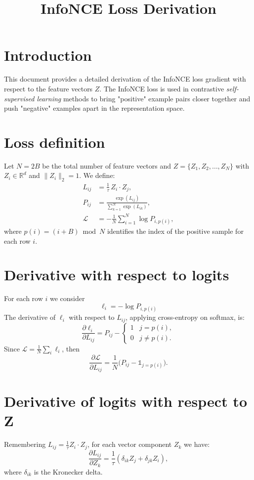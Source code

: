 \documentclass[a4paper,11pt]{article}
\title{InfoNCE Loss Derivation}
\author{}
\date{}
\begin{document}
\maketitle

\section*{Introduction}
This document provides a detailed derivation of the InfoNCE loss gradient with respect to the feature vectors $Z$. The InfoNCE loss is used in contrastive \emph{self-supervised learning} methods to bring "positive" example pairs closer together and push "negative" examples apart in the representation space.

\section{Loss definition}
Let $N=2B$ be the total number of feature vectors and $Z=\{Z_1, Z_2, \dots, Z_N\}$ with $Z_i\in\mathbb{R}^d$ and $\|Z_i\|_2=1$. We define:
\begin{align*}
L_{ij} &= \frac{1}{\tau} \, Z_i \cdot Z_j, \\
P_{ij} &= \frac{\exp(L_{ij})}{\sum_{k=1}^{N} \exp(L_{ik})}, \\
\mathcal{L} &= -\frac{1}{N} \sum_{i=1}^{N} \log P_{i, p(i)},
\end{align*}
where $p(i)=(i+B)\bmod N$ identifies the index of the positive sample for each row $i$.

\section{Derivative with respect to logits}
For each row $i$ we consider
\[
\ell_i = -\log P_{i,p(i)}
\]
The derivative of $\ell_i$ with respect to $L_{ij}$, applying cross-entropy on softmax, is:
\[
\frac{\partial \ell_i}{\partial L_{ij}} = P_{ij} - \begin{cases}1 & j = p(i), \\ 0 & j \neq p(i).\end{cases}
\]
Since $\mathcal{L}=\frac{1}{N}\sum_i \ell_i$, then
\[
\frac{\partial \mathcal{L}}{\partial L_{ij}} = \frac{1}{N}\bigl(P_{ij} - \mathbb{1}_{j=p(i)}\bigr).
\]

\section{Derivative of logits with respect to Z}
Remembering $L_{ij}=\tfrac{1}{\tau} Z_i \cdot Z_j$, for each vector component $Z_k$ we have:
\[
\frac{\partial L_{ij}}{\partial Z_k} = \frac{1}{\tau}(\delta_{ik} Z_j + \delta_{jk} Z_i),
\]
where $\delta_{ik}$ is the Kronecker delta.
\end{document}
